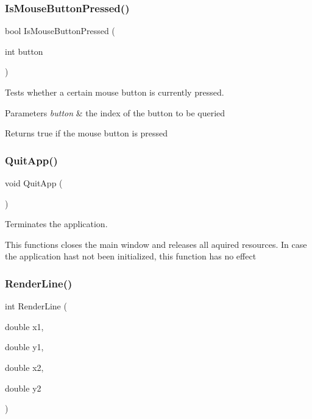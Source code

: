 \subsubsection{\texorpdfstring{Is\+Mouse\+Button\+Pressed()}{IsMouseButtonPressed()}}
{\footnotesize\ttfamily bool Is\+Mouse\+Button\+Pressed (\begin{DoxyParamCaption}\item[{int}]{button }\end{DoxyParamCaption})}

Tests whether a certain mouse button is currently pressed.


\begin{DoxyParams}{Parameters}
{\em button} & the index of the button to be queried \\
\hline
\end{DoxyParams}
\begin{DoxyReturn}{Returns}
{\ttfamily true} if the mouse button is pressed 
\end{DoxyReturn}
\mbox{\label{group__sdl__group_gaf4cba1685a7c46bccc7bbdf863114cee}} 
\subsubsection{\texorpdfstring{Quit\+App()}{QuitApp()}}
{\footnotesize\ttfamily void Quit\+App (\begin{DoxyParamCaption}{ }\end{DoxyParamCaption})}

Terminates the application.

This functions closes the main window and releases all aquired resources. In case the application hast not been initialized, this function has no effect \mbox{\label{group__sdl__group_gade420aec0a7492d5ac5f320b1ff4a814}} 
\subsubsection{\texorpdfstring{Render\+Line()}{RenderLine()}}
{\footnotesize\ttfamily int Render\+Line (\begin{DoxyParamCaption}\item[{double}]{x1,  }\item[{double}]{y1,  }\item[{double}]{x2,  }\item[{double}]{y2 }\end{DoxyParamCaption})}

